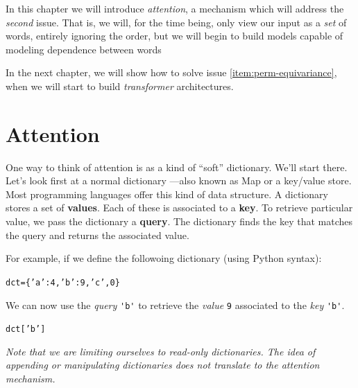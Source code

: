 \documentclass{pca}
\newenvironment{aside}{
	\setlength{\leftskip}{1em}\par\itshape
}{
	
	\setlength{\leftskip}{0em}\par
}
\newcommand{\gc}[1]{{\color{my-green} #1}}
\newcommand{\rc}[1]{{\color{my-red} #1}}
\newcommand{\bc}[1]{{\color{my-blue} #1}}
\theoremstyle{theorem}
\theoremstyle{definition}
\theoremstyle{proof}
\begin{document}
In this chapter we will introduce \emph{attention}, a mechanism which will address the \emph{second} issue. That is, we will, for the time being, only view our input as a \emph{set} of words, entirely ignoring the order, but we will begin to build models capable of modeling dependence between words


\begin{aside}
In the next chapter, we will show how to solve issue \ref{item:perm-equivariance}, when we will start to build \emph{transformer} architectures.
\end{aside}

\section{Attention}

One way to think of attention is as a kind of ``soft'' dictionary. We'll start there. Let's look first at a normal dictionary ---also known as Map or a key/value store. Most programming languages offer this kind of data structure. A dictionary stores a set of \rc{\textbf{values}}. Each  of these is associated to a \gc{\textbf{key}}. To retrieve particular value, we pass the dictionary a \bc{\textbf{query}}. The dictionary finds the key that matches the query and returns the associated value.

For example, if we define the followoing dictionary (using Python syntax):
\begin{alltt}\begin{center}
		dct = \{\gc{'a'} : \rc{4}, \gc{'b'} : \rc{9}, \gc{'c'}, \rc{0}\}
\end{center}\end{alltt}

We can now use the \emph{query} \bc{\lstinline|'b'|} to retrieve the \emph{value} \rc{\lstinline|9|} associated to the \emph{key} \gc{\lstinline|'b'|}.

\begin{alltt}\begin{center}
	dct[\bc{'b'}]
\end{center}\end{alltt}

\begin{aside} Note that we are limiting ourselves to read-only dictionaries. The idea of appending or manipulating dictionaries does not translate to the attention mechanism.
\end{aside}
\end{document}

